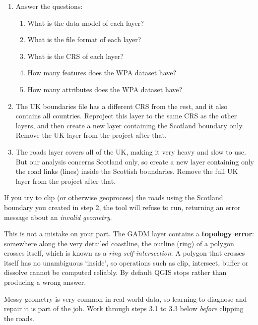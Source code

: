 \documentclass[
  letterpaper,
  DIV=11,
  numbers=noendperiod]{scrreprt}
\providecommand{\tightlist}{%
  \setlength{\itemsep}{0pt}\setlength{\parskip}{0pt}}\usepackage{longtable,booktabs,array}
\begin{document}
\begin{enumerate}
\def\labelenumi{\arabic{enumi})}
\item
  Answer the questions:

  \begin{enumerate}
  \def\labelenumii{\alph{enumii})}
  \tightlist
  \item
    What is the data model of each layer?
  \item
    What is the file format of each layer?
  \item
    What is the CRS of each layer?
  \item
    How many features does the WPA dataset have?
  \item
    How many attributes does the WPA dataset have?
  \end{enumerate}
\item
  The UK boundaries file has a different CRS from the rest, and it also
  contains all countries. Reproject this layer to the same CRS as the
  other layers, and then create a new layer containing the Scotland
  boundary only. Remove the UK layer from the project after that.
\item
  The roads layer covers all of the UK, making it very heavy and slow to
  use. But our analysis concerns Scotland only, so create a new layer
  containing only the road links (lines) inside the Scottish boundaries.
  Remove the full UK layer from the project after that.
\end{enumerate}

\begin{tcolorbox}[enhanced jigsaw, breakable, toptitle=1mm, colback=white, left=2mm, leftrule=.75mm, titlerule=0mm, colframe=quarto-callout-warning-color-frame, opacityback=0, title=\textcolor{quarto-callout-warning-color}{\faExclamationTriangle}\hspace{0.5em}{Careful: the boundaries layer has a topology error!}, toprule=.15mm, opacitybacktitle=0.6, bottomtitle=1mm, colbacktitle=quarto-callout-warning-color!10!white, bottomrule=.15mm, coltitle=black, rightrule=.15mm, arc=.35mm]

If you try to clip (or otherwise geoprocess) the roads using the
Scotland boundary you created in step 2, the tool will refuse to run,
returning an error message about an \emph{invalid geometry}.

This is not a mistake on your part. The GADM layer contains a
\textbf{topology error}: somewhere along the very detailed coastline,
the outline (ring) of a polygon crosses itself, which is known as a
\emph{ring self-intersection}. A polygon that crosses itself has no
unambiguous `inside', so operations such as clip, intersect, buffer or
dissolve cannot be computed reliably. By default QGIS stops rather than
producing a wrong answer.

Messy geometry is very common in real-world data, so learning to
diagnose and repair it is part of the job. Work through steps 3.1 to 3.3
below \emph{before} clipping the roads.

\end{tcolorbox}
\end{document}
